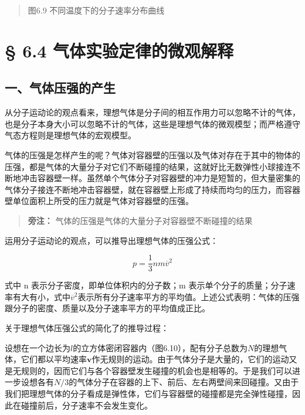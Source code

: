 \begin{quote}
图6.9 不同温度下的分子速率分布曲线
\end{quote}

\section{§ 6.4
气体实验定律的微观解释}\label{ux6c14ux4f53ux5b9eux9a8cux5b9aux5f8bux7684ux5faeux89c2ux89e3ux91ca}

\subsection{一、气体压强的产生}\label{ux4e00ux6c14ux4f53ux538bux5f3aux7684ux4ea7ux751f}

从分子运动论的观点看来，理想气体是分子间的相互作用力可以忽略不计的气体，也是分子本身大小可以忽略不计的气体，这些是理想气体的微观模型；而严格遵守气态方程则是理想气体的宏观模型。

气体的压强是怎样产生的呢？气体对容器壁的压强以及气体对存在于其中的物体的压强，都是气体的大量分子对它们不断碰撞的结果，这就好比无数弹性小球接连不断地冲击容器壁一样。虽然单个气体分子对容器壁的冲力是短暂的，但大量密集的气体分子接连不断地冲击容器壁，就在容器壁上形成了持续而均匀的压力，而容器壁单位面积上所受的压力就是气体对容器壁的压强。

\begin{quote}
\textbf{旁注：} 气体的压强是气体的大量分子对容器壁不断碰撞的结果
\end{quote}

运用分子运动论的观点，可以推导出理想气体的压强公式：

\[
p = \frac {1}{3} n m \overline {{v}} ^ {2} \tag {6.2}
\]

式中 n 表示分子密度，即单位体积内的分子数；m
表示单个分子的质量；分子速率有大有小，式中\(\overline{v}^{2}\)表示所有分子速率平方的平均值。上述公式表明：气体的压强跟分子的密度、质量以及分子速率平方的平均值成正比。

关于理想气体压强公式的简化了的推导过程：

设想在一个边长为\(l\)的立方体密闭容器内（图6.10），配有分子总数为\(N\)的理想气体，它们都以平均速率\(\pmb{v}\)作无规则的运动。由于气体分子是大量的，它们的运动又是无规则的，因而它们与各个容器壁发生碰撞的机会也是相等的。于是我们可以进一步设想各有\(N / 3\)的气体分子在容器的上下、前后、左右两壁间来回碰撞。又由于我们把理想气体的分子看成是弹性体，它们与容器壁的碰撞都是完全弹性碰撞，因此在碰撞前后，分子速率不会发生变化。

